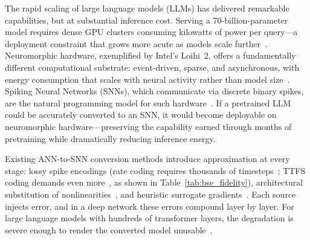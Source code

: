\documentclass{article}
\theoremstyle{plain}
\theoremstyle{definition}
\theoremstyle{remark}
\begin{document}
The rapid scaling of large language models (LLMs) has delivered remarkable capabilities, but at substantial inference cost. Serving a 70-billion-parameter model requires dense GPU clusters consuming kilowatts of power per query—a deployment constraint that grows more acute as models scale further~\citep{tay2022efficient}. Neuromorphic hardware, exemplified by Intel's Loihi~2, offers a fundamentally different computational substrate: event-driven, sparse, and asynchronous, with energy consumption that scales with neural activity rather than model size~\citep{davies2018loihi,davies2021loihi}. Spiking Neural Networks (SNNs),
which communicate via discrete binary spikes, are the natural programming model for such hardware~\citep{maass1997networks,roy2019towards}. If a pretrained LLM could be accurately converted to an SNN, it would become deployable on neuromorphic hardware—preserving the capability earned through months of pretraining while dramatically reducing inference energy.

Existing ANN-to-SNN conversion methods introduce approximation at every stage: lossy spike encodings (rate coding requires thousands of timesteps~\citep{rueckauer2017conversion,auge2021encoding}; TTFS coding demands even more~\citep{bonilla2022ttfs,stanojevic2024ttfs}, as shown in Table~\ref{tab:bse_fidelity}), architectural substitution of nonlinearities~\citep{zhou2023spikformer,yao2023sdt,spikedattention2024}, and heuristic surrogate gradients~\citep{neftci2019surrogate,shrestha2018slayer,deng2022tet}. Each source injects error, and in a deep network these errors compound layer by layer. For large language models with hundreds of transformer layers, the degradation is severe enough to render the converted model unusable~\citep{xing2025spikellm}.
\end{document}
